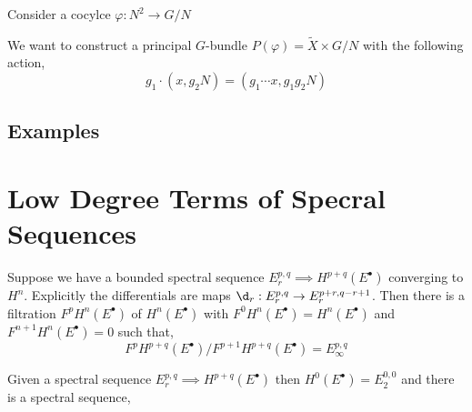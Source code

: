 \documentclass[12pt]{article}
\begin{document}
Consider a cocylce $\varphi : N^2 \to G/N$ 

We want to construct a principal $G$-bundle $P(\varphi) = \tilde{X} \times G/N$ with the following action,
\[ g_1 \cdot (x, g_2 N) = (g_1 \cdots x, g_1 g_2 N) \]

\subsection{Examples}

\section{Low Degree Terms of Specral Sequences}

Suppose we have a bounded spectral sequence $E_r^{p,q} \implies H^{p+q}(E^\bullet)$ converging to $H^n$. Explicitly the differentials are maps $\d_r : E^{p,q}_r \to E^{p + r, q - r + 1}_r$. Then there is a filtration $F^p H^{n}(E^\bullet)$ of $H^n(E^\bullet)$ with $F^0 H^n(E^\bullet) = H^n(E^\bullet)$ and $F^{n+1} H^n(E^\bullet) = 0$ such that,
\[ F^{p} H^{p+q}(E^\bullet) / F^{p+1} H^{p+q}(E^\bullet) = E_\infty^{p,q} \] 
\begin{prop}
Given a spectral sequence $E^{p,q}_r \implies H^{p+q}(E^\bullet)$ then $H^0(E^\bullet) = E^{0,0}_2$ and there is a spectral sequence,
\begin{center}
\end{center}
\end{prop}
\end{document}
